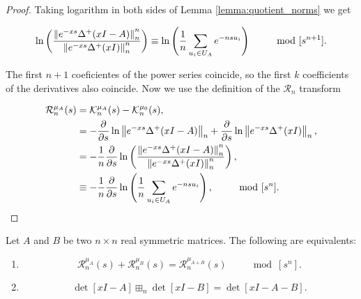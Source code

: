 \begin{proof}
    Taking logarithm in both sides of Lemma \ref{lemma:quotient_norms} we get 

    \begin{equation*}
        \ln \left( \frac{\left\lVert e^{-xs}\Delta^+(xI - A)\right\rVert_n^n}{\left\lVert e^{-xs}\Delta^+(xI)\right\rVert_n^n} \right) \equiv \ln\left( \frac1n\sum_{u_i \in U_A} e^{-ns u_i} \right) \qquad \mod [s^{n+1}].
    \end{equation*}

    The first $n+1$ coeficientes of the power series coincide, so the first $k$ coefficients of the derivatives also coincide. Now we use the definition of the $\mathcal R_n$ transform

    \begin{align*}
        \mathcal R_{n}^{\mu_A}(s) &= \mathcal K_{n}^{\mu_A}(s) - \mathcal K_n^{\mu_0}(s), \\
        &= - \frac{\partial}{\partial s} \ln \left\lVert e^{-xs}\Delta^+(xI -A) \right\rVert_n + \frac{\partial}{\partial s} \ln \left\lVert e^{-xs}\Delta^+(xI) \right\rVert_n,\\
        &= - \frac1n \frac{\partial}{\partial s} \ln \left( \frac{\left\lVert e^{-xs}\Delta^+(xI -A)\right\rVert_n^n}{ \left\lVert e^{-xs}\Delta^+(xI)\right\rVert_n^n } \right), \\
        &\equiv -\frac1n \frac{\partial}{\partial s} \ln \left( \frac1n \sum_{u_i \in U_A} e^{-nsu_i} \right), \qquad \mod[s^n].
    \end{align*}
\end{proof}

\begin{lemma}
    Let $A$ and $B$ be two $n\times n$ real symmetric matrices. The following are equivalents:

    \begin{enumerate}
        \item \[ \mathcal R_n^{\mu_A}(s) + \mathcal R_n^{\mu_B}(s) = \mathcal R_n^{\mu_{A+B}}(s) \qquad \mod[s^n]. \]
        \item \[ \det[xI - A] \boxplus_n \det[xI-B] = \det[xI - A - B]. \]
    \end{enumerate}
\end{lemma}

